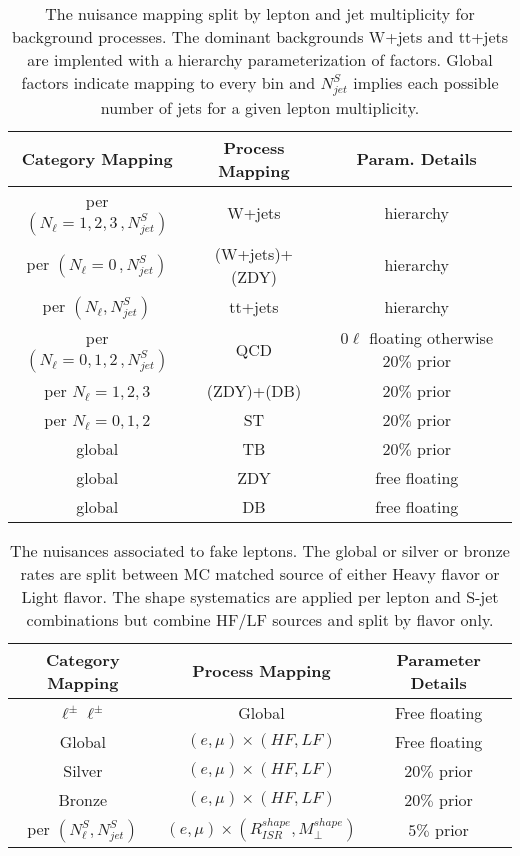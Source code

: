 \begin{table}
\centering
\caption{The nuisance mapping split by lepton and jet multiplicity for background processes. The dominant backgrounds W+jets and tt+jets are implented with a hierarchy parameterization of factors.  Global factors indicate mapping to every bin and $N_{jet}^S$ implies each possible number of jets for a given lepton multiplicity.}
 
\begin{tabular}{ccc}
\hline 
Category Mapping & Process Mapping & Param. Details \\ 
\hline 
\hline
per  $(N_\ell =1,2,3  \, ,N_{jet}^S)$ & W+jets & hierarchy \\ 

per $(N_\ell = 0 \, , N_{jet}^S)$ & (W+jets)+(ZDY) & hierarchy \\ 

per $(N_\ell, N_{jet}^S)$ & tt+jets & hierarchy \\ 
 
per $(N_\ell=0,1,2 \,, N_{jet}^S)$ & QCD & $0\ell$ floating otherwise $20\%$ prior \\ 
per $N_\ell=1,2,3$ & (ZDY)+(DB) & $20\%$ prior \\ 
per $N_\ell=0,1,2$ & ST & $20\%$ prior \\ 
global & TB & $20\%$ prior \\ 
global & ZDY & free floating \\ 
global & DB & free floating \\ 
\hline 
\end{tabular} 
\label{tab:procnuisance}

\end{table}

\begin{table}
\centering
\caption{The nuisances associated to fake leptons. The global or silver or bronze rates are split between MC matched source of either Heavy flavor or Light flavor. The shape systematics are applied per lepton and S-jet combinations but combine HF/LF sources and split by flavor only.}
\begin{tabular}{ccc}

Category Mapping & Process Mapping & Parameter Details \\ 
\hline 
\hline
$\ell^\pm\ell^\pm$ & Global & Free floating \\ 
 
Global & $(e,\mu)\times(HF,LF)$ & Free floating \\ 
 
Silver & $(e,\mu)\times(HF,LF)$ & $20\%$ prior \\ 
 
Bronze & $(e,\mu)\times(HF,LF)$ & $20\%$ prior \\ 
 
per $(N_\ell^S,N_{jet}^S)$ & $(e,\mu)\times(R_{ISR}^{shape}, M_\perp^{shape})$ & $5\%$ prior \\ 
\hline 
\end{tabular} 
\label{tab:fakenuisance}

\end{table}


